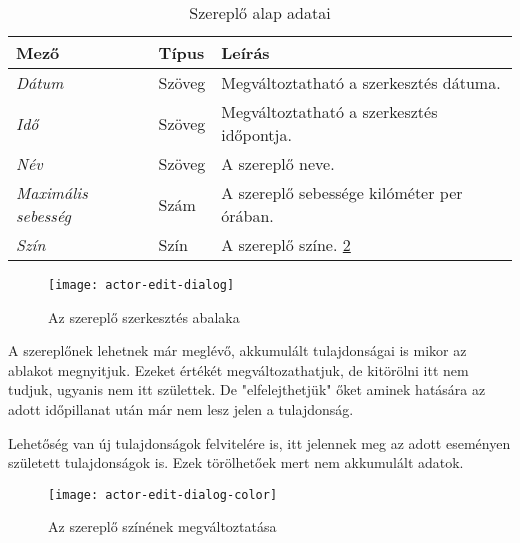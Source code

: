 \begin{table}[H]
	\centering
	\begin{tabular}{ | m{} | m{} | m{} | }
		\hline
		\textbf{Mező} & \textbf{Típus} & \textbf{Leírás} \\
		\hline \hline
		\emph{Dátum} & Szöveg & Megváltoztatható a szerkesztés dátuma. \\
		\hline
		\emph{Idő} & Szöveg & Megváltoztatható a szerkesztés időpontja. \\
		\hline
		\emph{Név} & Szöveg & A szereplő neve.  \\
		\hline
		\emph{Maximális sebesség} & Szám & A szereplő sebessége kilóméter per órában. \\
		\hline
		\emph{Szín} & Szín & A szereplő színe. \ref{fig:actor-edit-dialog-color}  \\
		\hline
	\end{tabular}
	\caption{Szereplő alap adatai}
	\label{tab:create-project-form}
\end{table}

\begin{figure}[h!]
	\centering
	\texttt{[image: actor-edit-dialog]}
	\caption{Az szereplő szerkesztés abalaka}
	\label{fig:actor-edit-dialog}
\end{figure}

A szereplőnek lehetnek már meglévő, akkumulált tulajdonságai is mikor az ablakot megnyitjuk. Ezeket értékét megváltozathatjuk, de kitörölni itt nem tudjuk, ugyanis nem itt születtek. De "elfelejthetjük" őket aminek hatására az adott időpillanat után már nem lesz jelen a tulajdonság.

Lehetőség van új tulajdonságok felvitelére is, itt jelennek meg az adott eseményen született tulajdonságok is. Ezek törölhetőek mert nem akkumulált adatok.

\begin{figure}[h!]
	\centering
	\texttt{[image: actor-edit-dialog-color]}
	\caption{Az szereplő színének megváltoztatása}
	\label{fig:actor-edit-dialog-color}
\end{figure}



